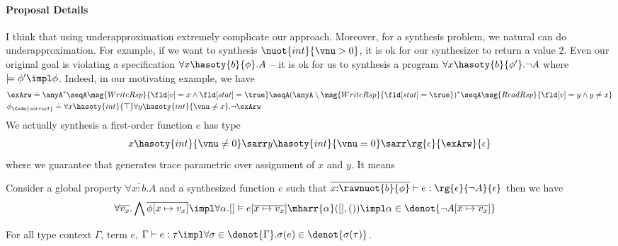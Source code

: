 \paragraph{Proposal Details} I think that using underapproximation extremely complicate our approach. Moreover, for a synthesis problem, we natural can do underapproximation. For example, if we want to synthesis $\nuot{int}{\vnu > 0}$, it is ok for our synthesizer to return a value $2$. Even our original goal is violating a specification $\forall x\hasoty{b}{\phi}.A$ -- it is ok for us to synthesis a program $\forall x\hasoty{b}{\phi'}.\neg A$ where $\models \phi' \impl \phi$. Indeed, in our motivating example, we have
{\footnotesize\begin{align*}
    &\exArw \doteq \anyA^* \seqA \msg{WriteRsp}{\fld[v] = x \land \fld[stat] = \true} \seqA (\anyA \setminus \msg{WriteRsp}{\fld[stat] = \true})^* \seqA  \msg{ReadRsp}{\fld[v] = y \land y \not= x}
    \\&\phi_\Code{correct} \doteq \forall x\hasoty{int}{\top} \forall y\hasoty{int}{\vnu \not = x}.\neg \exArw
\end{align*}}\noindent
We actually synthesis a first-order function $e$ has type
{\footnotesize\begin{align*}
    x\hasoty{int}{\vnu \not= 0} \sarr y\hasoty{int}{\vnu = 0} \sarr\rg{\epsilon}{\exArw}{\epsilon}
\end{align*}}\noindent
where we guarantee that generates trace parametric over assignment of $x$ and $y$. It means

\begin{definition}[Soundness] Consider a global property $\forall \overline{x{:}b}.A$ and a synthesized function $e$ such that $\overline{x{:}\rawnuot{b}{\phi}} \vdash e : \rg{\epsilon}{\neg A}{\epsilon}$
then we have
{\footnotesize\begin{align*}
    &\forall \overline{v_x}. \bigwedge \overline{\phi[x \mapsto v_x]} \impl \forall \alpha. [] \vDash e[\overline{x \mapsto v_x}] \mharr{\alpha} ([], ()) \impl \alpha \in \denot{\neg A[\overline{x \mapsto v_x}]}
\end{align*}}
\end{definition}

\begin{definition}[Fundamental] For all type context $\Gamma$, term $e$,  $\Gamma \vdash e : \tau \impl \forall \sigma \in\denot{\Gamma}. \sigma(e) \in  \denot{\sigma(\tau)}$.
\end{definition}

